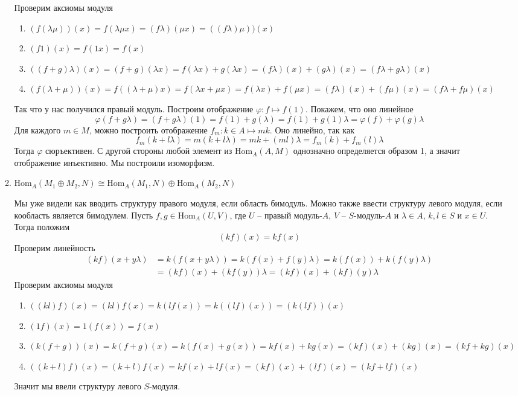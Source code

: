 \documentclass{article}
\begin{document}
\begin{enumerate}
\begin{enumerate}
                Проверим аксиомы модуля
                \begin{enumerate}
                    \item $(f(\lambda\mu))(x)=f(\lambda\mu x)=(f\lambda)(\mu x)=((f\lambda)\mu))(x)$
                    \item $(f1)(x)=f(1x)=f(x)$
                    \item $((f+g)\lambda)(x)=(f+g)(\lambda x)=f(\lambda x)+g(\lambda x)=(f\lambda)(x)+(g\lambda)(x)=(f\lambda+g\lambda)(x)$
                    \item $(f(\lambda+\mu))(x)=f((\lambda+\mu)x)=f(\lambda x+\mu x)=f(\lambda x)+f(\mu x)=(f\lambda)(x)+(f\mu)(x)=(f\lambda+f\mu)(x)$
                \end{enumerate}
                Так что у нас получился правый модуль. Построим отображение $\varphi:f\mapsto f(1)$.
                Покажем, что оно линейное
                \[\varphi(f+g\lambda)=(f+g\lambda)(1)=f(1)+g(\lambda)=f(1)+g(1)\lambda=\varphi(f)+\varphi(g)\lambda\]
                Для каждого $m\in M$, можно построить отображение $f_m:k\in A\mapsto mk$. Оно линейно,
                так как
                \[f_m(k+l\lambda)=m(k+l\lambda)=mk+(ml)\lambda=f_m(k)+f_m(l)\lambda\]
                Тогда $\varphi$ сюръективен. С другой стороны любой элемент из $\text{Hom}_A(A,M)$
                однозначно определяется образом 1, а значит отображение инъективно. Мы построили изоморфизм.

            \item $\text{Hom}_A(M_1\oplus M_2,N)\cong \text{Hom}_A(M_1,N)\oplus\text{Hom}_A(M_2,N)$
                
                Мы уже видели как вводить структуру правого модуля, если область бимодуль. Можно также ввести
                структуру левого модуля, если кообласть является бимодулем. Пусть $f,g\in\text{Hom}_A(U,V)$,
                где $U$ – правый модуль-$A$, $V$ – $S$-модуль-$A$ и $\lambda\in A$, $k,l\in S$ и $x\in U$.
                Тогда положим
                \[ (kf)(x)=kf(x) \]
                Проверим линейность
                \begin{align*}
                    (kf)(x+y\lambda)&=k(f(x+y\lambda))=k(f(x)+f(y)\lambda)=k(f(x))+k(f(y)\lambda)\\
                    &=(kf)(x)+(kf(y))\lambda=(kf)(x)+(kf)(y)\lambda
                \end{align*}
                Проверим аксиомы модуля
                \begin{enumerate}
                    \item $((kl)f)(x)=(kl)f(x)=k(lf(x))=k((lf)(x))=(k(lf))(x)$
                    \item $(1f)(x)=1(f(x))=f(x)$
                    \item $(k(f+g))(x)=k(f+g)(x)=k(f(x)+g(x))=kf(x)+kg(x)=(kf)(x)+(kg)(x)=(kf+kg)(x)$
                    \item $((k+l)f)(x)=(k+l)f(x)=kf(x)+lf(x)=(kf)(x)+(lf)(x)=(kf+lf)(x)$
                \end{enumerate}
                Значит мы ввели структуру левого $S$-модуля.
                

\end{enumerate}
\end{enumerate}
\end{document}
